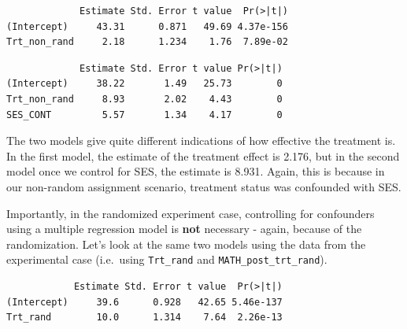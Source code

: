 \documentclass[
  letterpaper,
  DIV=11,
  numbers=noendperiod]{scrreprt}
\newenvironment{Shaded}{\begin{snugshade}}{\end{snugshade}}
\newcommand{\AttributeTok}[1]{\textcolor[rgb]{0.40,0.45,0.13}{#1}}
\newcommand{\FunctionTok}[1]{\textcolor[rgb]{0.28,0.35,0.67}{#1}}
\newcommand{\NormalTok}[1]{\textcolor[rgb]{0.00,0.23,0.31}{#1}}
\newcommand{\OtherTok}[1]{\textcolor[rgb]{0.00,0.23,0.31}{#1}}
\newcommand{\SpecialCharTok}[1]{\textcolor[rgb]{0.37,0.37,0.37}{#1}}
\theoremstyle{definition}
\theoremstyle{remark}
\begin{document}
\begin{verbatim}
             Estimate Std. Error t value  Pr(>|t|)
(Intercept)     43.31      0.871   49.69 4.37e-156
Trt_non_rand     2.18      1.234    1.76  7.89e-02
\end{verbatim}

\begin{verbatim}
             Estimate Std. Error t value Pr(>|t|)
(Intercept)     38.22       1.49   25.73        0
Trt_non_rand     8.93       2.02    4.43        0
SES_CONT         5.57       1.34    4.17        0
\end{verbatim}

The two models give quite different indications of how effective the
treatment is. In the first model, the estimate of the treatment effect
is 2.176, but in the second model once we control for SES, the estimate
is 8.931. Again, this is because in our non-random assignment scenario,
treatment status was confounded with SES.

Importantly, in the randomized experiment case, controlling for
confounders using a multiple regression model is \textbf{not} necessary
- again, because of the randomization. Let's look at the same two models
using the data from the experimental case (i.e.~using \texttt{Trt\_rand}
and \texttt{MATH\_post\_trt\_rand}).

\begin{Shaded}
\end{Shaded}

\begin{verbatim}
            Estimate Std. Error t value  Pr(>|t|)
(Intercept)     39.6      0.928   42.65 5.46e-137
Trt_rand        10.0      1.314    7.64  2.26e-13
\end{verbatim}

\begin{Shaded}
\end{Shaded}
\end{document}

